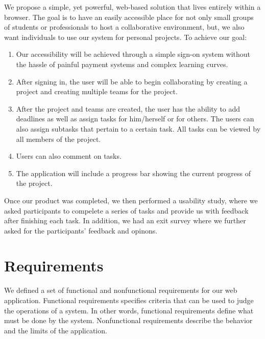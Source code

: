 We propose a simple, yet powerful, web-based solution that lives entirely within a browser. The goal is to have an easily accessible place for not only small groups of students or professionals to host a collaborative environment, but, we also want individuals to use our system for personal projects. To achieve our goal: 
\begin{enumerate}
	\item Our accessibility will be achieved through a simple sign-on system without the hassle of painful payment systems and complex learning curves. 
	\item After signing in, the user will be able to begin collaborating by creating a project and creating multiple teams for the project. 
	\item After the project and teams are created, the user has the ability to add deadlines as well as assign tasks for him/herself or for others. The users can also assign subtasks that pertain to a certain task. All tasks can be viewed by all members of the project.
	\item Users can also comment on tasks. 
	\item The application will include a progress bar showing the current progress of the project.
\end{enumerate}
Once our product was completed, we then performed a usability study, where we asked participants to compelete a series of tasks and provide us with feedback after finishing each task. In addition, we had an exit survey where we further asked for the participants' feedback and opinons.

\section{Requirements}
We defined a set of functional and nonfunctional requirements for our web application. Functional requirements specifies criteria that can be used to judge the operations of a system. In other words, functional requirements define what must be done by the system. Nonfunctional requirements describe the behavior and the limits of the application. 

